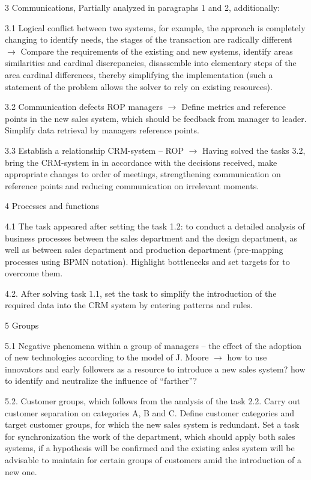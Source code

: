 \documentclass[11pt,a4paper]{book}
\begin{document}
3 Communications, Partially analyzed in paragraphs 1 and 2, additionally:

3.1 Logical conflict between two systems, for example, the approach is
completely changing to identify needs, the stages of the transaction are
radically different $\to$ Compare the requirements of the existing and new
systems, identify areas similarities and cardinal discrepancies, disassemble
into elementary steps of the area cardinal differences, thereby simplifying
the implementation (such a statement of the problem allows the solver to rely
on existing resources).

3.2 Communication defects ROP managers $\to$ Define metrics and reference
points in the new sales system, which should be feedback from manager to
leader. Simplify data retrieval by managers reference points.

3.3 Establish a relationship CRM-system -- ROP $\to$ Having solved the tasks
3.2, bring the CRM-system in in accordance with the decisions received, make
appropriate changes to order of meetings, strengthening communication on
reference points and reducing communication on irrelevant moments.

4 Processes and functions

4.1 The task appeared after setting the task 1.2: to conduct a detailed
analysis of business processes between the sales department and the design
department, as well as between sales department and production department
(pre-mapping processes using BPMN notation). Highlight bottlenecks and set
targets for to overcome them.

4.2.  After solving task 1.1, set the task to simplify the introduction of the
required data into the CRM system by entering patterns and rules.

5 Groups

5.1 Negative phenomena within a group of managers -- the effect of the
adoption of new technologies according to the model of J. Moore $\to$ how to
use innovators and early followers as a resource to introduce a new sales
system? how to identify and neutralize the influence of “farther”?

5.2.  Customer groups, which follows from the analysis of the task 2.2. Carry
out customer separation on categories A, B and C. Define customer categories
and target customer groups, for which the new sales system is redundant. Set a
task for synchronization the work of the department, which should apply both
sales systems, if a hypothesis will be confirmed and the existing sales system
will be advisable to maintain for certain groups of customers amid the
introduction of a new one.
\end{document}
